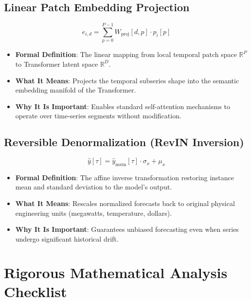 \documentclass[11pt,a4paper]{article}
\theoremstyle{definition}
\begin{document}
\subsection{Linear Patch Embedding Projection}
{\boldmath
\begin{equation}
e_{i, d} = \sum_{p=0}^{P-1} W_{\text{proj}}[d, p] \cdot p_i[p]
\end{equation}
}
\begin{itemize}
    \item \textbf{Formal Definition}: The linear mapping from local temporal patch space $\mathbb{R}^P$ to Transformer latent space $\mathbb{R}^D$.
    \item \textbf{What It Means}: Projects the temporal subseries shape into the semantic embedding manifold of the Transformer.
    \item \textbf{Why It Is Important}: Enables standard self-attention mechanisms to operate over time-series segments without modification.
\end{itemize}

\subsection{Reversible Denormalization (RevIN Inversion)}
{\boldmath
\begin{equation}
\widehat{y}[\tau] = \widehat{y}_{\text{norm}}[\tau] \cdot \sigma_x + \mu_x
\end{equation}
}
\begin{itemize}
    \item \textbf{Formal Definition}: The affine inverse transformation restoring instance mean and standard deviation to the model's output.
    \item \textbf{What It Means}: Rescales normalized forecasts back to original physical engineering units (megawatts, temperature, dollars).
    \item \textbf{Why It Is Important}: Guarantees unbiased forecasting even when series undergo significant historical drift.
\end{itemize}

\section{Rigorous Mathematical Analysis Checklist}
\end{document}
